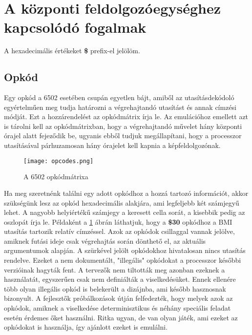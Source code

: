 \section{A központi feldolgozóegységhez kapcsolódó fogalmak}

\begin{note}
	A hexadecimális értékeket \textbf{\$} prefix-el jelölöm.
\end{note}

\subsection{Opkód} 
Egy opkód a 6502 esetében csupán egyetlen bájt, amiből az utasításdekódoló egyértelműen meg tudja határozni a végrehajtandó utasítást és annak címzési módját.
Ezt a hozzárendelést az opkódmátrix írja le. Az emulációhoz emellett azt is tárolni kell az opkódmátrixban, hogy a végrehajtandó művelet hány központi órajel alatt fejeződik be, ugyanis ebből tudjuk megállapítani, hogy a processzor utasításával párhuzamosan hány órajelet kell kapnia a képfeldolgozónak. 

\begin{figure}[H]
	\centering
	\texttt{[image: opcodes.png]}
	\caption{A 6502 opkódmátrixa}
	\label{fig:opcodes}
\end{figure}

Ha meg szeretnénk találni egy adott opkódhoz a hozzá tartozó információt, akkor szükségünk lesz az opkód hexadecimális alakjára, ami legfeljebb két számjegyű lehet. A nagyobb helyiértékű számjegy a keresett cella sorát, a kisebbik pedig az oszlopát írja le. Példaként a \ref{fig:opcodes} ábrán láthatjuk, hogy a \textbf{\$30} opkódhoz a BMI utasítás tartozik relatív címzéssel.
Azok az opkódok csillaggal vannak jelölve, amiknek futási ideje csak végrehajtás során dönthető el, az aktuális argumentumok alapján.
A szürkével jelölt opkódokhoz hivatalosan nincs utasítás rendelve. 
Ezeket a nem dokumentált, "illegális" opkódokat a processzor későbbi 
verzióinak hagyták fent. A tervezők nem tiltották meg azonban ezeknek a használatát, 
egyszerűen csak nem definiálták a viselkedésüket. Ennek ellenére több olyan illegális opkód is belekerült a dizájnba, ami később hasznosnak bizonyult. A fejlesztők próbálkozások útján
felfedezték, hogy melyek azok az opkódok, amiknek a viselkedése determinisztikus és néhány speciális feladat esetén érdemes őket használni.
Ritka ugyan, de van olyan játék, ami ezeket az opkódokat is használja, így ajánlott ezeket is emulálni.

